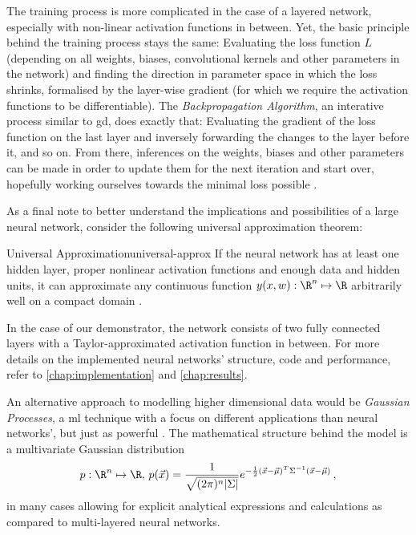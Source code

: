 The training process is more complicated in the case of a layered network, especially with non-linear activation functions in between.
Yet, the basic principle behind the training process stays the same: Evaluating the loss function $L$ (depending on all weights, biases, convolutional kernels and other parameters in the network) and finding the direction in parameter space in which the loss shrinks, formalised by the layer-wise gradient (for which we require the activation functions to be differentiable).
The \textit{Backpropagation Algorithm}, an interative process similar to \gls{gd}, does exactly that: Evaluating the gradient of the loss function on the last layer and inversely forwarding the changes to the layer before it, and so on.
From there, inferences on the weights, biases and other parameters can be made in order to update them for the next iteration and start over, hopefully working ourselves towards the minimal loss possible \parencite{bishop-pattern-recognition-and-ml}.

As a final note to better understand the implications and possibilities of a large neural network, consider the following universal approximation theorem:

\begin{theorem}{Universal Approximation}{universal-approx}
  If the neural network has at least one hidden layer, proper nonlinear activation functions and enough data and hidden units, it can approximate any continuous function $y(x, w): \R^n \mapsto \R$ arbitrarily well on a compact domain \parencite{1989-HornikMultilayerFN}.
\end{theorem}

In the case of our demonstrator, the network consists of two fully connected layers with a Taylor-approximated  activation function in between.
For more details on the implemented neural networks' structure, code and performance, refer to \cref{chap:implementation} and \cref{chap:results}.

An alternative approach to modelling higher dimensional data would be \textit{Gaussian Processes}, a \glsdesc{ml} technique with a focus on different applications than neural networks', but just as powerful \parencite[Chapter 45]{2005-mackay-information-theory}.
The mathematical structure behind the model is a multivariate Gaussian distribution $$p: \R^n \mapsto \R,\, p(\vec{x}) = \frac{1}{\sqrt{(2\pi)^n |\Sigma|}} e^{-\frac{1}{2} (\vec{x}-\vec{\mu})^T \Sigma\inv (\vec{x}-\vec{\mu})} \,,$$ in many cases allowing for explicit analytical expressions and calculations as compared to multi-layered neural networks.


